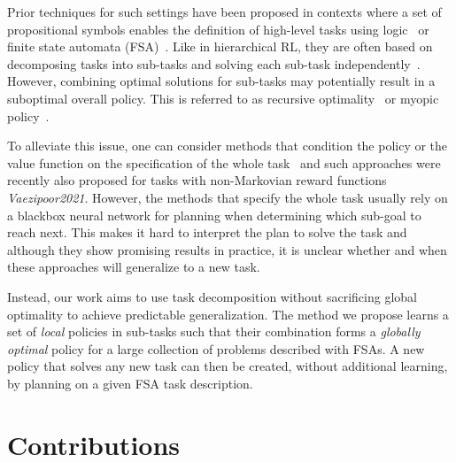 Prior techniques for such settings have been proposed in contexts where a set of propositional symbols enables the definition of high-level tasks using logic~\citep{Vaezipoor2021, ToroIcarte2019}
or finite state automata (FSA)~\citep{Icarte2022}. Like in hierarchical RL,
they are often based on decomposing tasks into sub-tasks and solving each sub-task independently~\citep{Dietterich2000, Sutton1999}. 
However, combining optimal solutions for sub-tasks may potentially result in a suboptimal overall policy. 
This is referred to as recursive optimality~\citep{Dietterich2000} or myopic policy~\citep{Vaezipoor2021}. 

To alleviate this issue, one can consider methods that condition the policy or the value function on the specification of the whole task~\citep{Schaul2015} and such approaches were recently also proposed for tasks with non-Markovian reward functions \textit{Vaezipoor2021}. However, the methods that specify the whole task usually rely on a blackbox neural network for planning when determining which sub-goal to reach next. This makes it hard to interpret the plan to solve the task and although  they show promising results in practice, %
it is unclear whether and when these approaches will generalize to a new task.


Instead, our work aims to use task decomposition without sacrificing global optimality to achieve predictable generalization. The method we propose learns a set of \textit{local} policies in sub-tasks such that their combination forms a \textit{globally optimal} policy for a large collection of problems described with FSAs. A new policy that solves any new task can then be created, without additional learning, by planning on a given FSA task description.
\section{Contributions}

